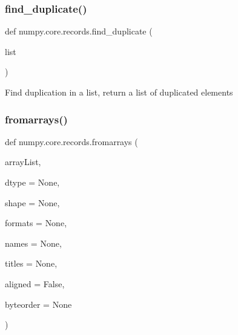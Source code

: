  \mbox{\label{namespacenumpy_1_1core_1_1records_ad7a3634fa20117393946ae437544bfcf}} 
\subsubsection{\texorpdfstring{find\+\_\+duplicate()}{find\_duplicate()}}
{\footnotesize\ttfamily def numpy.\+core.\+records.\+find\+\_\+duplicate (\begin{DoxyParamCaption}\item[{}]{list }\end{DoxyParamCaption})}

\begin{DoxyVerb}Find duplication in a list, return a list of duplicated elements\end{DoxyVerb}
 \mbox{\label{namespacenumpy_1_1core_1_1records_ad87b52d2052c1c40fb033acfb1e2c19b}} 
\subsubsection{\texorpdfstring{fromarrays()}{fromarrays()}}
{\footnotesize\ttfamily def numpy.\+core.\+records.\+fromarrays (\begin{DoxyParamCaption}\item[{}]{array\+List,  }\item[{}]{dtype = {\ttfamily None},  }\item[{}]{shape = {\ttfamily None},  }\item[{}]{formats = {\ttfamily None},  }\item[{}]{names = {\ttfamily None},  }\item[{}]{titles = {\ttfamily None},  }\item[{}]{aligned = {\ttfamily False},  }\item[{}]{byteorder = {\ttfamily None} }\end{DoxyParamCaption})}


